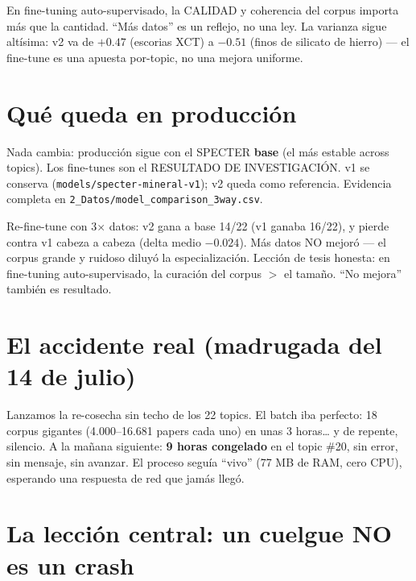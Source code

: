 \documentclass[11pt,a4paper]{article}
\begin{document}
\begin{ojo}
En fine-tuning auto-supervisado, la CALIDAD y coherencia del corpus importa más que la
cantidad. ``Más datos'' es un reflejo, no una ley. La varianza sigue altísima: v2 va de
$+0.47$ (escorias XCT) a $-0.51$ (finos de silicato de hierro) --- el fine-tune es una
apuesta por-topic, no una mejora uniforme.
\end{ojo}

\section{Qué queda en producción}

Nada cambia: producción sigue con el SPECTER \textbf{base} (el más estable across topics).
Los fine-tunes son el RESULTADO DE INVESTIGACIÓN. v1 se conserva
(\texttt{models/specter-mineral-v1}); v2 queda como referencia. Evidencia completa en
\texttt{2\_Datos/model\_comparison\_3way.csv}.

\begin{resumen}
Re-fine-tune con 3$\times$ datos: v2 gana a base 14/22 (v1 ganaba 16/22), y pierde contra
v1 cabeza a cabeza (delta medio $-0.024$). Más datos NO mejoró --- el corpus grande y
ruidoso diluyó la especialización. Lección de tesis honesta: en fine-tuning
auto-supervisado, la curación del corpus $>$ el tamaño. ``No mejora'' también es
resultado.
\end{resumen}
\clearpage
{}
{}

\section{El accidente real (madrugada del 14 de julio)}

Lanzamos la re-cosecha sin techo de los 22 topics. El batch iba perfecto: 18 corpus
gigantes (4.000--16.681 papers cada uno) en unas 3 horas\ldots{} y de repente, silencio.
A la mañana siguiente: \textbf{9 horas congelado} en el topic \#20, sin error, sin
mensaje, sin avanzar. El proceso seguía ``vivo'' (77 MB de RAM, cero CPU), esperando
una respuesta de red que jamás llegó.

\section{La lección central: un cuelgue NO es un crash}
\end{document}
